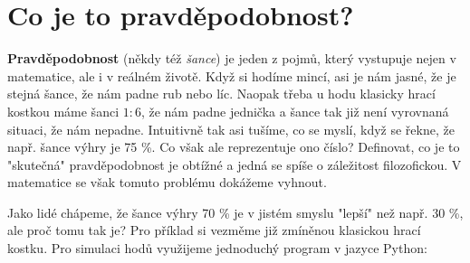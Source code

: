 \section{Co je to pravděpodobnost?}

\textbf{Pravděpodobnost} (někdy též \emph{šance}) je jeden z pojmů, který vystupuje nejen v matematice, ale i v reálném životě. Když si hodíme mincí, asi je nám jasné, že je stejná šance, že nám padne rub nebo líc. Naopak třeba u hodu klasicky hrací kostkou máme šanci $1:6$, že nám padne jednička a šance tak již není vyrovnaná situaci, že nám nepadne. Intuitivně tak asi tušíme, co se myslí, když se řekne, že např. šance výhry je 75 \%. Co však ale reprezentuje ono číslo? Definovat, co je to "skutečná" pravděpodobnost je obtížné a jedná se spíše o záležitost filozofickou. V matematice se však tomuto problému dokážeme vyhnout.\par
Jako lidé chápeme, že šance výhry 70 \% je v jistém smyslu "lepší" než např. 30 \%, ale proč tomu tak je? Pro příklad si vezměme již zmíněnou klasickou hrací kostku. Pro simulaci hodů využijeme jednoduchý program v jazyce Python:

